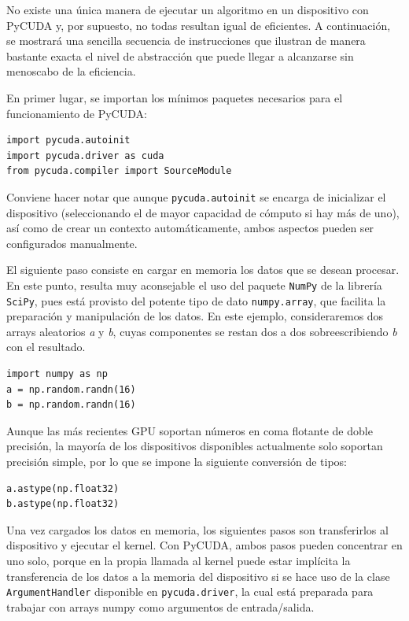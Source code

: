 \documentclass[twocolumn,twoside]{Jornadas}
\begin{document}
No existe una única manera de ejecutar un algoritmo en un dispositivo con PyCUDA y, por supuesto, no todas resultan igual de eficientes. A continuación, se mostrará una sencilla secuencia de instrucciones que ilustran de manera bastante exacta el nivel de abstracción que puede llegar a alcanzarse sin menoscabo de la eficiencia.

En primer lugar, se importan los mínimos paquetes necesarios para el funcionamiento de PyCUDA:

\begin{verbatim}
import pycuda.autoinit
import pycuda.driver as cuda
from pycuda.compiler import SourceModule
\end{verbatim}

Conviene hacer notar que aunque {\tt pycuda.autoinit} se encarga de inicializar el dispositivo (seleccionando el de mayor capacidad de cómputo si hay más de uno), así como de crear un contexto automáticamente, ambos aspectos pueden ser configurados manualmente.

El siguiente paso consiste en cargar en memoria los datos que se desean procesar. En este punto, resulta muy aconsejable el uso del paquete {\tt NumPy} de la librería {\tt SciPy}, pues está provisto del potente tipo de dato {\tt numpy.array}, que facilita la preparación y manipulación de los datos. En este ejemplo, consideraremos dos arrays aleatorios \emph{a} y \emph{b}, cuyas componentes se restan dos a dos sobreescribiendo \emph{b} con el resultado.

\begin{verbatim}
import numpy as np
a = np.random.randn(16)
b = np.random.randn(16)
\end{verbatim}

Aunque las más recientes GPU soportan números en coma flotante de doble precisión, la mayoría de los dispositivos disponibles actualmente solo soportan precisión simple, por lo que se impone la siguiente conversión de tipos:

\begin{verbatim}
a.astype(np.float32)
b.astype(np.float32)
\end{verbatim}

Una vez cargados los datos en memoria, los siguientes pasos son transferirlos al dispositivo y ejecutar el kernel. Con PyCUDA, ambos pasos pueden concentrar en uno solo, porque en la propia llamada al kernel puede estar implícita la transferencia de los datos a la memoria del dispositivo si se hace uso de la clase {\tt ArgumentHandler} disponible en {\tt pycuda.driver}, la cual está preparada para trabajar con arrays numpy como argumentos de entrada/salida.
\end{document}
